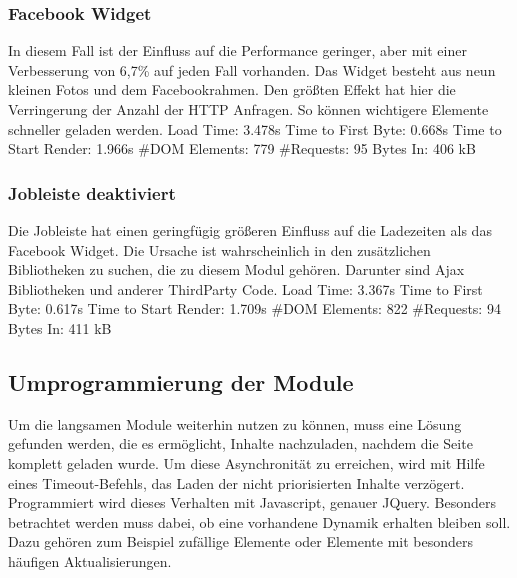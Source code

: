 \subsubsection{Facebook Widget} In diesem Fall ist der Einfluss auf die Performance geringer, aber mit einer Verbesserung von 6,7\% auf jeden Fall vorhanden. Das Widget besteht aus neun kleinen Fotos und dem Facebookrahmen. Den größten Effekt hat hier die Verringerung der Anzahl der HTTP Anfragen. So können wichtigere Elemente schneller geladen werden.
Load Time: 3.478s
Time to First Byte: 0.668s %
Time to Start Render: 1.966s
\#DOM Elements: 779 	
\#Requests: 95 
Bytes In: 406 kB 

\subsubsection{Jobleiste deaktiviert} Die Jobleiste hat einen geringfügig größeren Einfluss auf die Ladezeiten als das Facebook Widget. Die Ursache ist wahrscheinlich in den zusätzlichen Bibliotheken zu suchen, die zu diesem Modul gehören. Darunter sind Ajax Bibliotheken und anderer ThirdParty Code. 
Load Time: 3.367s
Time to First Byte: 0.617s %
Time to Start Render: 1.709s
\#DOM Elements: 822 	
\#Requests: 94 
Bytes In: 411 kB

\subsection{Umprogrammierung der Module}
Um die langsamen Module weiterhin nutzen zu können, muss eine Lösung gefunden werden, die es ermöglicht, Inhalte nachzuladen, nachdem die Seite komplett geladen wurde. Um diese Asynchronität zu erreichen, wird mit Hilfe eines Timeout-Befehls, das Laden der nicht priorisierten Inhalte verzögert. Programmiert wird dieses Verhalten mit Javascript, genauer JQuery. Besonders betrachtet werden muss dabei, ob eine vorhandene Dynamik erhalten bleiben soll. Dazu gehören zum Beispiel zufällige Elemente oder Elemente mit besonders häufigen Aktualisierungen.

